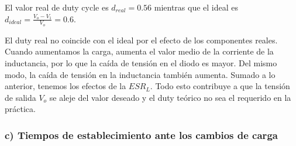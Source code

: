\documentclass[e4_tp2_main.tex]{subfiles}
\begin{document}
El valor real de duty cycle es $d_{real}=0.56$ mientras que el ideal es $d_{ideal}= \frac{V_o-V_1}{V_o}=0.6$.

El duty real no coincide con el ideal por el efecto de los componentes reales. 
Cuando aumentamos la carga, aumenta el valor medio de la corriente de la inductancia, por lo que la ca\'ida de tensi\'on en el diodo es mayor. Del mismo modo, la ca\'ida de tensi\'on en la inductancia tambi\'en aumenta. Sumado a lo anterior, tenemos los efectos de la $ESR_L$. Todo esto contribuye a que la tensi\'on de salida $V_o$ se aleje del valor deseado y el duty te\'orico no sea el requerido en la pr\'actica.

\subsubsection*{c) Tiempos de establecimiento ante los cambios de carga }
\end{document}
